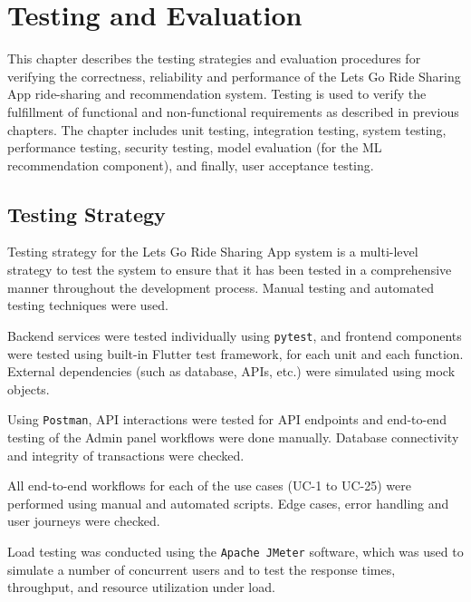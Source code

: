 
\chapter{Testing and Evaluation}
\justifying

This chapter describes the testing strategies and evaluation procedures for verifying the correctness, reliability and performance of the Lets Go Ride Sharing App ride-sharing and recommendation system. Testing is used to verify the fulfillment of functional and non-functional requirements as described in previous chapters. The chapter includes unit testing, integration testing, system testing, performance testing, security testing, model evaluation (for the ML recommendation component), and finally, user acceptance testing.


\section{Testing Strategy}

Testing strategy for the Lets Go Ride Sharing App system is a multi-level strategy to test the system to ensure that it has been tested in a comprehensive manner throughout the development process. Manual testing and automated testing techniques were used.

Backend services were tested individually using \texttt{pytest}, and frontend components were tested using built-in Flutter test framework, for each unit and each function. External dependencies (such as database, APIs, etc.) were simulated using mock objects.

Using \texttt{Postman}, API interactions were tested for API endpoints and end-to-end testing of the Admin panel workflows were done manually. Database connectivity and integrity of transactions were checked.

All end-to-end workflows for each of the use cases (UC-1 to UC-25) were performed using manual and automated scripts. Edge cases, error handling and user journeys were checked.

Load testing was conducted using the \texttt{Apache JMeter} software, which was used to simulate a number of concurrent users and to test the response times, throughput, and resource utilization under load.

